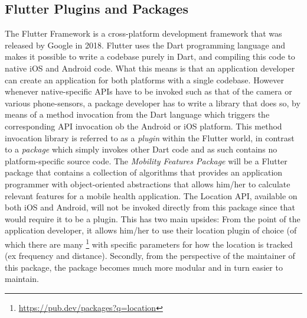 \subsection{Flutter Plugins and Packages}
The Flutter Framework is a cross-platform development framework that was released by Google in 2018. Flutter uses the Dart programming language and makes it possible to write a codebase purely in Dart, and compiling this code to native iOS and Android code. What this means is that an application developer can create an application for both platforms with a single codebase. However whenever native-specific APIs have to be invoked such as that of the camera or various phone-sensors, a package developer has to write a library that does so, by means of a method invocation from the Dart language which triggers the corresponding API invocation ob the Android or iOS platform. This method invocation library is referred to as a \textit{plugin} within the Flutter world, in contrast to a \textit{package} which simply invokes other Dart code and as such contains no platform-specific source code. The \textit{Mobility Features Package} will be a Flutter package that contains a collection of algorithms that provides an application programmer with object-oriented abstractions that allows him/her to calculate relevant features for a mobile health application. The Location API, available on both iOS and Android, will not be invoked directly from this package since that would require it to be a plugin. This has two main upsides: From the point of the application developer, it allows him/her to use their location plugin of choice (of which there are many \footnote{\url{https://pub.dev/packages?q=location}} with specific parameters for how the location is tracked (ex frequency and distance). Secondly, from the perspective of the maintainer of this package, the package becomes much more modular and in turn easier to maintain.